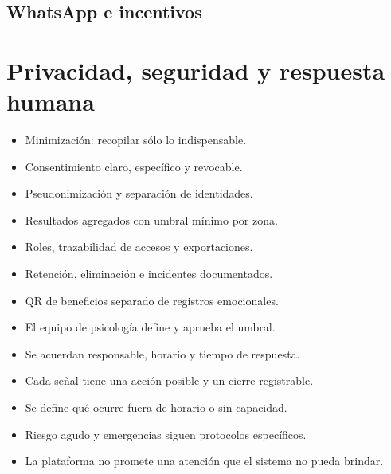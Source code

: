 \documentclass[11pt,a4paper]{article}
\begin{document}
\subsection{WhatsApp e incentivos}

\clearpage

\section{Privacidad, seguridad y respuesta humana}

\begin{minipage}[t]{.48\textwidth}
  \begin{card}
    \begin{itemize}
      \item Minimización: recopilar sólo lo indispensable.
      \item Consentimiento claro, específico y revocable.
      \item Pseudonimización y separación de identidades.
      \item Resultados agregados con umbral mínimo por zona.
      \item Roles, trazabilidad de accesos y exportaciones.
      \item Retención, eliminación e incidentes documentados.
      \item QR de beneficios separado de registros emocionales.
    \end{itemize}
  \end{card}
\end{minipage}\hfill
\begin{minipage}[t]{.48\textwidth}
  \begin{card}
    \begin{itemize}
      \item El equipo de psicología define y aprueba el umbral.
      \item Se acuerdan responsable, horario y tiempo de respuesta.
      \item Cada señal tiene una acción posible y un cierre registrable.
      \item Se define qué ocurre fuera de horario o sin capacidad.
      \item Riesgo agudo y emergencias siguen protocolos específicos.
      \item La plataforma no promete una atención que el sistema no pueda brindar.
    \end{itemize}
  \end{card}
\end{minipage}
\end{document}
